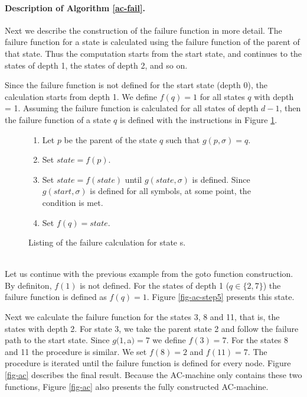 \documentclass[english,twoside,censored,csm,algorithms-track-2020]{HYthesisML}
\theoremstyle{plain}
\theoremstyle{definition}
\newcounter{testexample}
\numberwithin{testexample}{chapter}
\begin{document}
  \paragraph{Description of Algorithm \ref{ac-fail}.}  
  Next we describe the construction of the failure function in more detail. The failure function
  for a state is calculated using the failure function of the parent of that state. Thus the computation
  starts from the start state, and continues to the states of depth 1, the states of depth 2, and so on.

  Since the failure function is not defined for the start state (depth 0), the calculation starts
  from depth 1. We define $f(q)=1$ for all states $q$ with depth = 1. Assuming the failure function is
  calculated for all states of depth $d-1$, then the failure function of a state $q$ is defined with the
  instructions in Figure \ref{lst-failure-calculation}.
  
  \begin{figure}[b]
  \begin{enumerate}
  \item Let $p$ be the parent of the state $q$ such that $g(p,\sigma) = q$.
  \item Set $state = f(p)$.
  \item Set $state = f(state)$ until $g(state,\sigma)$ is defined. Since $g(start,\sigma)$ is defined
    for all symbols, at some point, the condition is met.
  \item Set $f(q) = state$.
  \end{enumerate}
   \caption{Listing of the failure calculation for state s.} \label{lst-failure-calculation}    
  \end{figure}



  \begin{testexample}[]~\label{exmp-fail}\\
    Let us continue with the previous example from the goto function construction. By definiton, $f(1)$
    is not defined. For the states of depth 1 ($q\in\{2,7\}$) the failure function is defined as
    $f(q)=1$. Figure \ref{fig-ac-step5} presents this state.

  Next we calculate the failure function for the states 3, 8 and 11, that is, the states with depth 2.
  For state 3, we take the parent state 2 and follow the failure path to the start state. Since
  $g(1,$a$) = 7$ we define $f(3)=7$. For the states 8 and 11 the procedure is similar. We set 
  $f(8)=2$ and $f(11)=7$. The procedure is iterated until the failure function is defined for every
  node. Figure \ref{fig-ac} describes the final result. Because the AC-machine only contains these
  two functions, Figure \ref{fig-ac} also presents the fully constructed AC-machine.
  \end{testexample}
\end{document}
